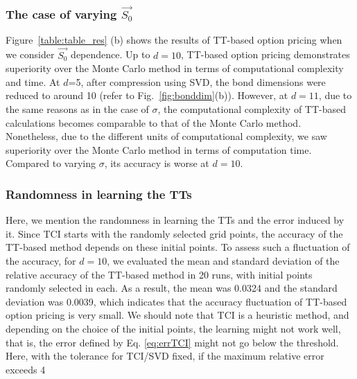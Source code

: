 \subsubsection{The case of varying $\vec{S_0}$}
Figure~\ref{table:table_res} (b) shows the results of TT-based option pricing when we consider $\vec{S_0}$ dependence.
Up to \(d=10\), TT-based option pricing demonstrates superiority over the Monte Carlo method in terms of computational complexity and time. 
At $d$=5, after compression using SVD, the bond dimensions were reduced to around 10 (refer to Fig.~\ref{fig:bonddim}(b)). 
However, at \(d=11\), due to the same reasons as in the case of \(\sigma\), the computational complexity of TT-based calculations becomes comparable to that of the Monte Carlo method. 
Nonetheless, due to the different units of computational complexity, we saw superiority over the Monte Carlo method in terms of computation time. 
Compared to varying \(\sigma\), its accuracy is worse at \(d=10\).

\subsubsection{Randomness in learning the TTs}

Here, we mention the randomness in learning the TTs and the error induced by it.
Since TCI starts with the randomly selected grid points, the accuracy of the TT-based method depends on these initial points.
To assess such a fluctuation of the accuracy, for \(d=10\), we evaluated the mean and standard deviation of the relative accuracy of the TT-based method in 20 runs, with initial points randomly selected in each. As a result, the mean was 0.0324 and the standard deviation was 0.0039, which indicates that the accuracy fluctuation of TT-based option pricing is very small.
We should note that TCI is a heuristic method, and depending on the choice of the initial points, the learning might not work well, that is, the error defined by Eq. \eqref{eq:errTCI} might not go below the threshold. 
Here, with the tolerance for TCI/SVD fixed, if the maximum relative error exceeds 4\





